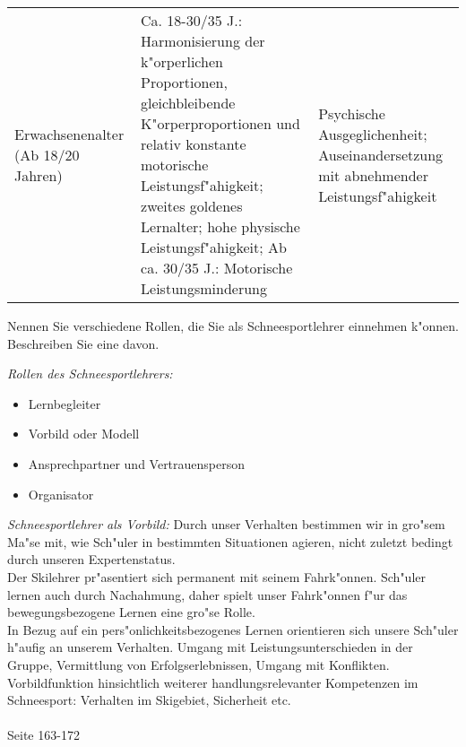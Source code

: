 \begin{solution}
\begin{table}
\begin{center}
\begin{tabular}{p{}|p{}|p{}}
Erwachsenenalter (Ab 18/20 Jahren) & Ca. 18-30/35 J.: Harmonisierung der k"orperlichen Proportionen, gleichbleibende K"orperproportionen und relativ konstante motorische Leistungsf"ahigkeit; zweites goldenes Lernalter; hohe physische Leistungsf"ahigkeit; Ab ca. 30/35 J.: Motorische Leistungsminderung & Psychische Ausgeglichenheit; Auseinandersetzung mit abnehmender Leistungsf"ahigkeit
    \end{tabular}
  \end{center}
\end{table}
\end{solution}

\begin{question}{4}
Nennen Sie verschiedene Rollen, die Sie als Schneesportlehrer einnehmen k"onnen. Beschreiben Sie eine davon. 
\end{question}
\begin{solution}
\emph{Rollen des Schneesportlehrers:}
\begin{itemize}
\item Lernbegleiter
\item Vorbild oder Modell
\item Ansprechpartner und Vertrauensperson
\item Organisator
\end{itemize}
\emph{Schneesportlehrer als Vorbild:}
Durch unser Verhalten bestimmen wir in gro"sem Ma"se mit, wie Sch"uler in bestimmten Situationen agieren, nicht zuletzt bedingt durch unseren Expertenstatus.\\
Der Skilehrer pr"asentiert sich permanent mit seinem Fahrk"onnen. Sch"uler lernen auch durch Nachahmung, daher spielt unser Fahrk"onnen f"ur das bewegungsbezogene Lernen eine gro"se Rolle.\\
In Bezug auf ein pers"onlichkeitsbezogenes Lernen orientieren sich unsere Sch"uler h"aufig an unserem Verhalten. Umgang mit Leistungsunterschieden in der Gruppe, Vermittlung von Erfolgserlebnissen, Umgang mit Konflikten.\\
Vorbildfunktion hinsichtlich weiterer handlungsrelevanter Kompetenzen im Schneesport: Verhalten im Skigebiet, Sicherheit etc.\\\\
 Seite 163-172
\end{solution}

